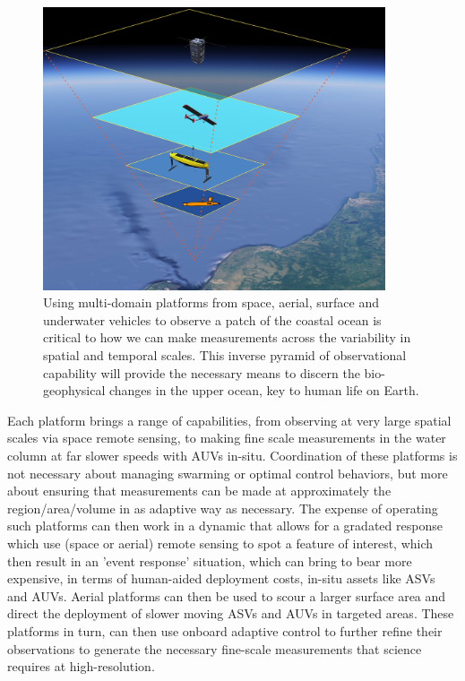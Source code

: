 \begin{figure}[!h]
  \centering
  \includegraphics[width=0.9\textwidth]{fig/inverse-pyramid.jpg}
  \caption{Using multi-domain platforms from space, aerial, surface
    and underwater vehicles to observe a patch of the coastal ocean is
    critical to how we can make measurements across the variability in
    spatial and temporal scales. This \textsf{inverse pyramid of
      observational} capability will provide the necessary means to
    discern the bio-geophysical changes in the upper ocean, key to
    human life on Earth.}
  \label{fig:inverse}
\end{figure}

Each platform brings a range of capabilities, from observing at very
large spatial scales via space remote sensing, to making fine scale
measurements in the water column at far slower speeds with AUVs
in-situ. Coordination of these platforms is not necessary about
managing swarming or optimal control behaviors, but more about
ensuring that measurements can be made at approximately the
region/area/volume in as adaptive way as necessary. The expense of
operating such platforms can then work in a dynamic that allows for a
gradated response which use (space or aerial) remote sensing to spot a
feature of interest, which then result in an 'event response'
situation, which can bring to bear more expensive, in terms of
human-aided deployment costs, in-situ assets like ASVs and
AUVs. Aerial platforms can then be used to scour a larger surface area
and direct the deployment of slower moving ASVs and AUVs in targeted
areas. These platforms in turn, can then use onboard adaptive control
to further refine their observations to generate the necessary
fine-scale measurements that science requires at high-resolution. 

